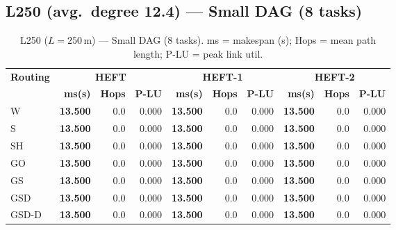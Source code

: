 \documentclass[11pt]{article}
\newcommand{\win}[1]{\textcolor{green!50!black}{\textbf{#1}}}
\begin{document}
\subsection{L250 (avg.\ degree 12.4) --- Small DAG (8 tasks)}
\begin{table}[H]
\centering\small
\begin{tabular}{l r r r r r r r r r}
\toprule
\textbf{Routing} & \multicolumn{3}{c}{\textbf{HEFT}} & \multicolumn{3}{c}{\textbf{HEFT-1}} & \multicolumn{3}{c}{\textbf{HEFT-2}} \\
\cmidrule(lr){2-4}\cmidrule(lr){5-7}\cmidrule(lr){8-10}
& \textbf{ms(s)} & \textbf{Hops} & \textbf{P-LU} & \textbf{ms(s)} & \textbf{Hops} & \textbf{P-LU} & \textbf{ms(s)} & \textbf{Hops} & \textbf{P-LU} \\
\midrule
  W & \win{13.500} & 0.0 & 0.000 & \win{13.500} & 0.0 & 0.000 & \win{13.500} & 0.0 & 0.000 \\
  S & \win{13.500} & 0.0 & 0.000 & \win{13.500} & 0.0 & 0.000 & \win{13.500} & 0.0 & 0.000 \\
  SH & \win{13.500} & 0.0 & 0.000 & \win{13.500} & 0.0 & 0.000 & \win{13.500} & 0.0 & 0.000 \\
  GO & \win{13.500} & 0.0 & 0.000 & \win{13.500} & 0.0 & 0.000 & \win{13.500} & 0.0 & 0.000 \\
  GS & \win{13.500} & 0.0 & 0.000 & \win{13.500} & 0.0 & 0.000 & \win{13.500} & 0.0 & 0.000 \\
  GSD & \win{13.500} & 0.0 & 0.000 & \win{13.500} & 0.0 & 0.000 & \win{13.500} & 0.0 & 0.000 \\
  GSD-D & \win{13.500} & 0.0 & 0.000 & \win{13.500} & 0.0 & 0.000 & \win{13.500} & 0.0 & 0.000 \\
\bottomrule
\end{tabular}
\caption{L250 ($L=250$\,m) --- Small DAG (8 tasks). ms = makespan (s); Hops = mean path length; P-LU = peak link util.}
\end{table}
\end{document}
